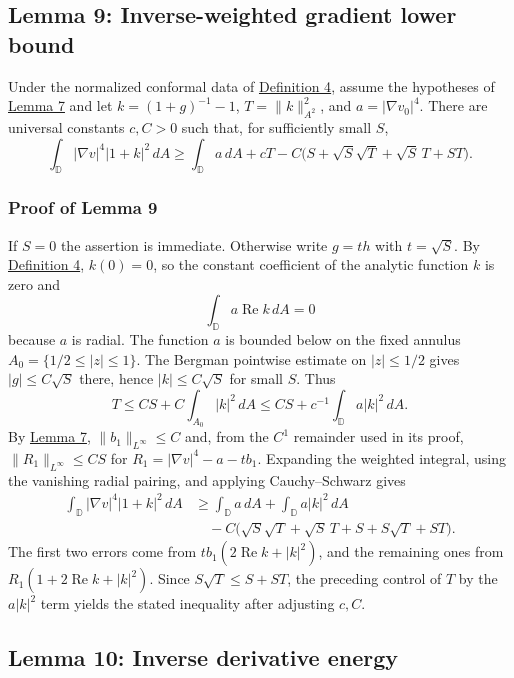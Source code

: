 \documentclass[11pt]{article}
\begin{document}
\subsection{Lemma 9: Inverse-weighted gradient lower
bound}\label{lem-inverse-left-bound}

Under the normalized conformal data of
\hyperref[def-conformal-data]{Definition 4}, assume the hypotheses of
\hyperref[lem-gradient-perturbation]{Lemma 7} and let
\(k=(1+g)^{-1}-1\), \(T=\|k\|_{A^2}^2\), and \(a=|\nabla v_0|^4\). There
are universal constants \(c,C>0\) such that, for sufficiently small
\(S\), \[
\int_{\mathbb D}|\nabla v|^4|1+k|^2\,dA
\ge \int_{\mathbb D}a\,dA+cT-C\bigl(S+\sqrt S\sqrt T+\sqrt S\,T+ST\bigr).
\]

\subsubsection{Proof of Lemma 9}\label{proof-lem-inverse-left-bound}

If \(S=0\) the assertion is immediate. Otherwise write \(g=th\) with
\(t=\sqrt S\). By \hyperref[def-conformal-data]{Definition 4},
\(k(0)=0\), so the constant coefficient of the analytic function \(k\)
is zero and \[
\int_{\mathbb D}a\operatorname{Re}k\,dA=0
\] because \(a\) is radial. The function \(a\) is bounded below on the
fixed annulus \(A_0=\{1/2\le|z|\le1\}\). The Bergman pointwise estimate
on \(|z|\le1/2\) gives \(|g|\le C\sqrt S\) there, hence
\(|k|\le C\sqrt S\) for small \(S\). Thus \[
T\le CS+C\int_{A_0}|k|^2\,dA
\le CS+c^{-1}\int_{\mathbb D}a|k|^2\,dA.
\] By \hyperref[lem-gradient-perturbation]{Lemma 7},
\(\|b_1\|_{L^\infty}\le C\) and, from the \(C^1\) remainder used in its
proof, \(\|R_1\|_{L^\infty}\le CS\) for \(R_1=|\nabla v|^4-a-tb_1\).
Expanding the weighted integral, using the vanishing radial pairing, and
applying Cauchy--Schwarz gives \[
\begin{aligned}
\int_{\mathbb D}|\nabla v|^4|1+k|^2\,dA
&\ge \int_{\mathbb D}a\,dA+\int_{\mathbb D}a|k|^2\,dA\\
&\quad-C\bigl(\sqrt S\sqrt T+\sqrt S\,T+S+S\sqrt T+ST\bigr).
\end{aligned}
\] The first two errors come from \(t b_1(2\operatorname{Re}k+|k|^2)\),
and the remaining ones from \(R_1(1+2\operatorname{Re}k+|k|^2)\). Since
\(S\sqrt T\le S+ST\), the preceding control of \(T\) by the \(a|k|^2\)
term yields the stated inequality after adjusting \(c,C\).

\subsection{Lemma 10: Inverse derivative
energy}\label{lem-inverse-energy}
\end{document}
